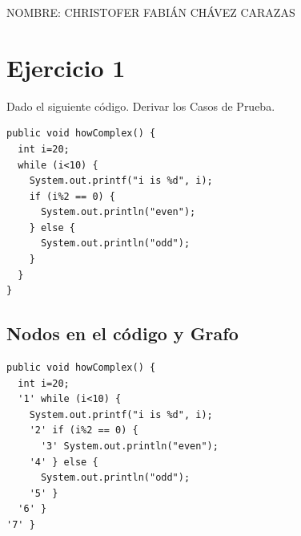 \documentclass[a4paper,12pt]{article}
\begin{document}
\begin{Large}
 NOMBRE: CHRISTOFER FABIÁN CHÁVEZ CARAZAS
\end{Large}

\section{Ejercicio 1}

Dado el siguiente código. Derivar los Casos de Prueba.

\begin{lstlisting}
public void howComplex() {
  int i=20;
  while (i<10) {
    System.out.printf("i is %d", i);
    if (i%2 == 0) {
      System.out.println("even");
    } else {
      System.out.println("odd");
    }
  }
}
\end{lstlisting}

\subsection{Nodos en el código y Grafo}

\begin{lstlisting}
public void howComplex() {
  int i=20;
  '1' while (i<10) {
    System.out.printf("i is %d", i);
    '2' if (i%2 == 0) {
      '3' System.out.println("even");
    '4' } else {
      System.out.println("odd");
    '5' }
  '6' }
'7' } 
\end{lstlisting}
\end{document}
